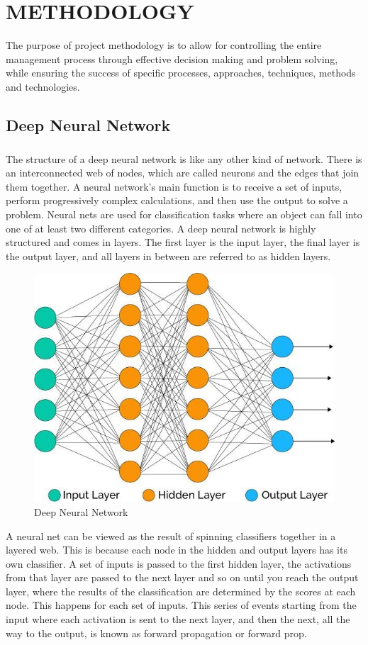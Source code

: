\chapter{METHODOLOGY}

The purpose of project methodology is to allow for controlling the entire management process through effective decision making and problem solving, while ensuring the success of specific processes, approaches, techniques, methods and technologies.

\section{Deep Neural Network }
\paragraph{}
The structure of a deep neural network is like any other kind of network. There is an interconnected web of nodes, which are called neurons and the edges that join them together. A neural network's main function is to receive a set of inputs, perform progressively complex calculations, and then use the output to solve a problem.
Neural nets are used for classification tasks where an object can fall into one of at least two different categories. A deep neural network is highly structured and comes in layers. The first layer is the input layer, the final layer is the output layer, and all layers in between are referred to as hidden layers.
\begin{figure}[h]
	\label{ss}
	\centering
	\includegraphics[width= 9 cm]{neural.jpg}
	\caption{Deep Neural Network}
\end{figure}
A neural net can be viewed as the result of spinning classifiers together in a layered web.
This is because each node in the hidden and output layers has its own classifier. A set of inputs is passed to the first hidden layer, the activations from that layer are passed to the next layer and so on until you reach the output layer, where the results of the classification are determined by the scores at each node. This happens for each set of inputs.
This series of events starting from the input where each activation is sent to the next layer,
and then the next, all the way to the output, is known as forward propagation or forward prop.


